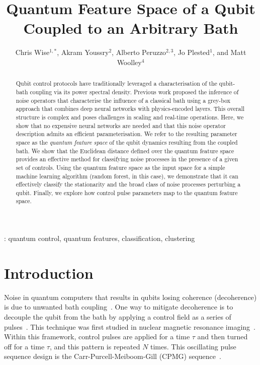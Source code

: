 \documentclass[12pt]{iopart}
\begin{document}
\title[Quantum Feature Space of a Qubit Coupled to an Arbitrary Bath]{Quantum Feature Space of a Qubit Coupled to an Arbitrary Bath}

\author{Chris Wise$^{1,*}$, Akram Youssry$^{2}$, Alberto Peruzzo$^{2,3}$, Jo Plested$^{1}$, and Matt Woolley$^4$}

\address{$^1$School of Systems and Computing, UNSW, Canberra, ACT, 2601, Australia}
\address{$^2$Quantum Photonics Laboratory and Centre for Quantum Computation and Communication Technology, RMIT University, Melbourne, VIC 3000, Australia}
\address{$^3$Quandela, Massy, France}
\address{$^4$School of Engineering and Technology and Centre for Engineered Quantum Systems, UNSW, Canberra, ACT, 2601, Australia}
\address{$^*$Author to whom any correspondence should be addressed.}

\begin{abstract}
    Qubit control protocols have traditionally leveraged a characterisation of the qubit-bath coupling via its power spectral density. Previous work proposed the inference of noise operators that characterise the influence of a classical bath using a grey-box approach that combines deep neural networks with physics-encoded layers. This overall structure is complex and poses challenges in scaling and real-time operations. Here, we show that no expensive neural networks are needed and that this noise operator description admits an efficient parameterisation. We refer to the resulting parameter space as the \textit{quantum feature space} of the qubit dynamics resulting from the coupled bath. We show that the Euclidean distance defined over the quantum feature space provides an effective method for classifying noise processes in the presence of a given set of controls. Using the quantum feature space as the input space for a simple machine learning algorithm (random forest, in this case), we demonstrate that it can effectively classify the stationarity and the broad class of noise processes perturbing a qubit. Finally, we explore how control pulse parameters map to the quantum feature space.
\end{abstract}

\vspace{2pc}
:  quantum control, quantum features, classification, clustering

\section{Introduction}
Noise in quantum computers that results in qubits losing coherence (decoherence) is due to unwanted bath coupling~\cite{bravyi2018correcting}. One way to mitigate decoherence is to decouple the qubit from the bath by applying a control field as a series of pulses~\cite{viola1999dynamical}. This technique was first studied in nuclear magnetic resonance imaging~\cite{degen2017quantum, boss2016one}. Within this framework, control pulses are applied for a time $\tau$ and then turned off for a time $\tau$, and this pattern is repeated $N$ times. This oscillating pulse sequence design is the Carr-Purcell-Meiboom-Gill (CPMG) sequence~\cite{carr1954effects, meiboom1958modified}.
\end{document}
